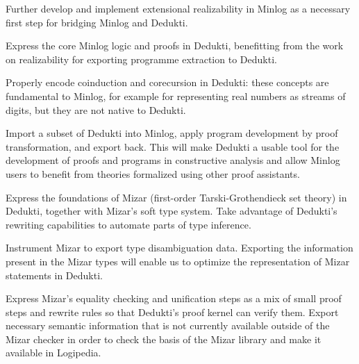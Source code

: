 \begin{workpackage}
\begin{tasklist}
\begin{task}[id=minlog,
  title=Express the theory of Minlog in Dedukti,
  shorttitle=Minlog,
  lead=Lmu,
  LmuRM=16, %
  wphases=1-48,
  ]
  \vspace{-5mm}
  \begin{compactitem}
  \item Further develop and implement extensional realizability in Minlog as
    a necessary first step for bridging Minlog and Dedukti.
  \item Express the core Minlog logic and proofs in Dedukti, benefitting from
    the work on realizability for exporting programme extraction to Dedukti.
  \item Properly encode coinduction and corecursion in Dedukti: these concepts are
    fundamental to Minlog, for example for representing real numbers as streams of
    digits, but they are not native to Dedukti.
  \item Import a subset of Dedukti into Minlog, apply program development by proof
    transformation, and export back. This will make Dedukti a usable tool for the
    development of proofs and programs in constructive analysis and allow Minlog
    users to benefit from theories formalized using other proof assistants.
  \end{compactitem}
\end{task}

\begin{task}[id=mizar,
  title=Express the theory of Mizar in Dedukti,
  shorttitle=Mizar,
  lead=Bia,   %
  BiaRM=70, %
  InnRM=12,   %
  wphases=1-48,
  ]
  \vspace{-5mm}
  \begin{compactitem}
  \item Express the foundations of Mizar (first-order Tarski-Grothendieck set
    theory) in Dedukti, together with Mizar's soft
    type system. Take advantage of Dedukti's rewriting capabilities to automate
    parts of type inference.
  \item Instrument Mizar to export type disambiguation data. Exporting the
    information present in the Mizar types will enable us to optimize the
    representation of Mizar statements in Dedukti.
  \item Express Mizar's equality checking and unification steps as a mix of
    small proof steps and rewrite rules so that Dedukti's proof kernel can
    verify them. Export necessary semantic information that is not currently
    available outside of the Mizar checker in order to check the basis of the
    Mizar library and make it available in Logipedia.
  \end{compactitem}
\end{task}


\end{tasklist}
\end{workpackage}
